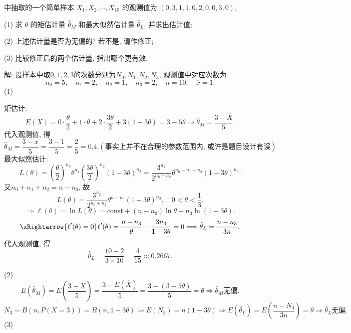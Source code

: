 \documentclass[standard]{ExBook}
\renewenvironment{shaded}{%
  \def\FrameCommand{\fboxsep=\FrameSep \colorbox{shadecolor}}%
  \MakeFramed{\advance\hsize-\width \FrameRestore}%
}{%
  \endMakeFramed
}
\begin{document}
\begin{qitems}
\begin{bbox}
\begin{shaded}
中抽取的一个简单样本 \(X_1, X_2, \cdots, X_{10}\) 的观测值为 \((0, 3, 1, 1, 0, 2, 0, 0, 3, 0)\),

(1) 求 \(\theta\) 的矩估计量 \(\hat{\theta}_M\) 和最大似然估计量 \(\hat{\theta}_L\), 并求出估计值;  

(2) 上述估计量是否为无偏的? 若不是, 请作修正;  

(3) 比较修正后的两个估计量, 指出哪个更有效.
    \end{shaded}
    \end{bbox}

\vspace{\dimexpr2.5cm-5em\relax}

解: 设样本中取$0,1,2,3$的次数分别为$N_0,N_1,N_2,N_3$, 观测值中对应次数为
$$
n_0=5,\quad n_1=2,\quad n_2=1,\quad n_3=2,\quad n=10,\quad \overline{x}=1.
$$
(1)

矩估计:
$$
E(X)
=0\cdot\frac{\theta}{2}
+1\cdot\theta
+2\cdot\frac{3\theta}{2}
+3(1-3\theta)
=3-5\theta
\Longrightarrow
\hat{\theta}_{M}
=\frac{3-\overline{X}}{5}.
$$
代入观测值, 得
$$
\hat{\theta}_{M}
=\frac{3-\overline{x}}{5}
=\frac{3-1}{5}
=\frac{2}{5}
=0.4. 
(\text{事实上并不在合理的参数范围内, 或许是题目设计有误})
$$
最大似然估计:
$$
L(\theta)
=
\left(\frac{\theta}{2}\right)^{n_0}
\theta^{n_1}
\left(\frac{3\theta}{2}\right)^{n_2}
(1-3\theta)^{n_3}
=
\frac{3^{n_2}}{2^{n_0+n_2}}
\theta^{n_0+n_1+n_2}(1-3\theta)^{n_3}.
$$
又$n_0+n_1+n_2=n-n_3$, 故
$$
L(\theta)
=
\frac{3^{n_2}}{2^{n_0+n_2}}
\theta^{n-n_3}(1-3\theta)^{n_3},
\quad 0<\theta<\frac13.
$$
$$
\Longrightarrow
\ell(\theta)
=\ln L(\theta)
=\mathrm{const}+(n-n_3)\ln\theta+n_3\ln(1-3\theta).
$$
$$
\xRightarrow{\ell'(\theta)=0}
\ell'(\theta)
=
\frac{n-n_3}{\theta}
-\frac{3n_3}{1-3\theta}
=0
\Longrightarrow
\hat{\theta}_{L}
=
\frac{n-n_3}{3n}.
$$
代入观测值, 得
$$
\hat{\theta}_{L}
=
\frac{10-2}{3\times10}
=
\frac{4}{15}
\approx0.2667.
$$

(2)
$$
E(\hat{\theta}_{M})
=
E\left(\frac{3-\overline{X}}{5}\right)
=
\frac{3-E(\overline{X})}{5}
=
\frac{3-(3-5\theta)}{5}
=
\theta
\Longrightarrow
\hat{\theta}_{M}\text{无偏}.
$$
$$
N_3\sim B(n,P(X=3))=B(n,1-3\theta)
\Longrightarrow
E(N_3)
=n(1-3\theta)
\Longrightarrow
E(\hat{\theta}_{L})
=
E\left(\frac{n-N_3}{3n}\right)
=
\theta
\Longrightarrow
\hat{\theta}_{L}\text{无偏}.
$$
(3)


\end{qitems}
\end{document}
